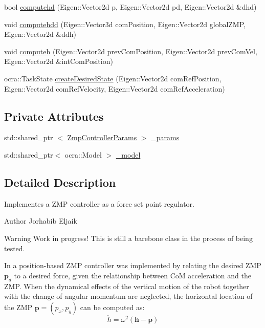 \begin{DoxyCompactItemize}
\item 
bool \hyperlink{classZmpController_a5eab881a51fb2ace1a1d494171353bc7}{computehd} (\-Eigen\-::\-Vector2d p, \-Eigen\-::\-Vector2d pd, \-Eigen\-::\-Vector2d \&dhd)
\item 
void \hyperlink{classZmpController_aa450c67048a44fe0dfadf07cd30165e7}{computehdd} (\-Eigen\-::\-Vector3d com\-Position, \-Eigen\-::\-Vector2d global\-Z\-M\-P, \-Eigen\-::\-Vector2d \&ddh)
\item 
void \hyperlink{classZmpController_a3e275de73186b889c755e6dc618d29bf}{computeh} (\-Eigen\-::\-Vector2d prev\-Com\-Position, \-Eigen\-::\-Vector2d prev\-Com\-Vel, \-Eigen\-::\-Vector2d \&int\-Com\-Position)
\item 
ocra\-::\-Task\-State \hyperlink{classZmpController_a23e84c312c71daaf010c9600663db0b7}{create\-Desired\-State} (\-Eigen\-::\-Vector2d com\-Ref\-Position, \-Eigen\-::\-Vector2d com\-Ref\-Velocity, \-Eigen\-::\-Vector2d com\-Ref\-Acceleration)
\end{DoxyCompactItemize}
\subsection*{\-Private \-Attributes}
\begin{DoxyCompactItemize}
\item 
std\-::shared\-\_\-ptr\*
$<$ \hyperlink{structZmpControllerParams}{\-Zmp\-Controller\-Params} $>$ \hyperlink{classZmpController_a59a45aafc8a49a0d49966f7ed061a022}{\-\_\-params}
\item 
std\-::shared\-\_\-ptr$<$ ocra\-::\-Model $>$ \hyperlink{classZmpController_ac86a58d1f870ce27c78b0f6d2294e05f}{\-\_\-model}
\end{DoxyCompactItemize}


\subsection{\-Detailed \-Description}
\-Implementes a \-Z\-M\-P controller as a force set point regulator. 

\begin{DoxyAuthor}{\-Author}
\-Jorhabib \-Eljaik
\end{DoxyAuthor}
\cite{krause2012stabilization}

\begin{DoxyWarning}{\-Warning}
\-Work in progress! \-This is still a barebone class in the process of being tested.
\end{DoxyWarning}
\-In \cite{krause2012stabilization} a position-\/based \-Z\-M\-P controller was implemented by relating the desired \-Z\-M\-P $ \mathbf{p}_d $ to a desired force, given the relationship between \-Co\-M acceleration and the \-Z\-M\-P. \-When the dynamical effects of the vertical motion of the robot together with the change of angular momentum are neglected, the horizontal location of the \-Z\-M\-P $\mathbf{p} = (p_x, p_y)$ can be computed as\-: \label{classZmpController_simplifiedZMP}%
\hypertarget{classZmpController_simplifiedZMP}{}%
 \begin{equation} \ddot{h} = \omega^2(\mathbf{h} - \mathbf{p}) \end{equation}

